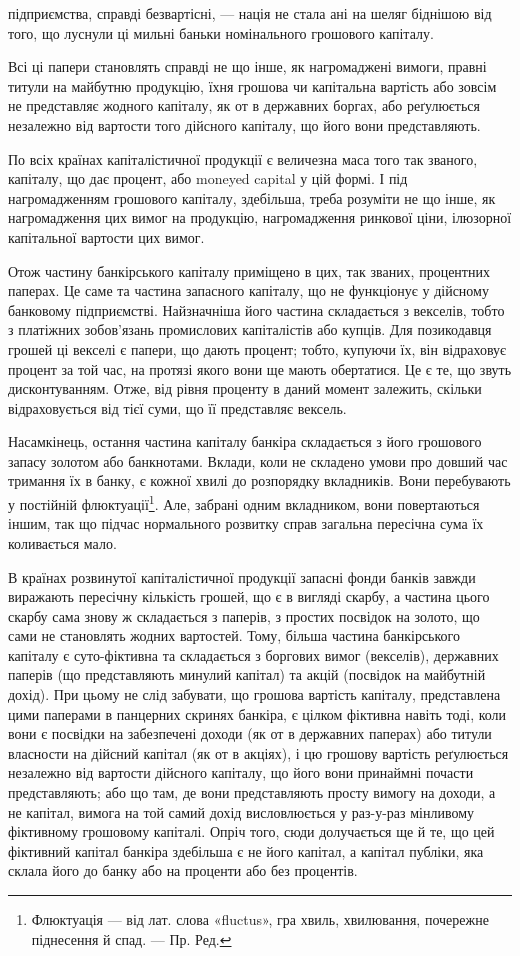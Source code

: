 підприємства, справді безвартісні, — нація не стала ані на шеляг біднішою
від того, що луснули ці мильні баньки номінального грошового капіталу.

Всі ці папери становлять справді не що інше, як нагромаджені вимоги,
правні титули на майбутню продукцію, їхня грошова чи капітальна вартість
або зовсім не представляє жодного капіталу, як от в державних боргах, або
реґулюється незалежно від вартости того дійсного капіталу, що його вони представляють.

По всіх країнах капіталістичної продукції є величезна маса того так званого,
капіталу, що дає процент, або moneyed capital у цій формі. І під нагромадженням
грошового капіталу, здебільша, треба розуміти не що інше, як нагромадження
цих вимог на продукцію, нагромадження ринкової ціни, ілюзорної
капітальної вартости цих вимог.

Отож частину банкірського капіталу приміщено в цих, так званих, процентних
паперах. Це саме та частина запасного капіталу, що не функціонує
у дійсному банковому підприємстві. Найзначніша його частина складається з
векселів, тобто з платіжних зобов’язань промислових капіталістів або купців.
Для позикодавця грошей ці векселі є папери, що дають процент; тобто, купуючи
їх, він відраховує процент за той час, на протязі якого вони ще мають обертатися.
Це є те, що звуть дисконтуванням. Отже, від рівня проценту в даний момент
залежить, скільки відраховується від тієї суми, що її представляє вексель.

Насамкінець, остання частина капіталу банкіра складається з його грошового
запасу золотом або банкнотами. Вклади, коли не складено умови про
довший час тримання їх в банку, є кожної хвилі до розпорядку вкладників.
Вони перебувають у постійній флюктуації\footnote*{
Флюктуація — від лат. слова «fluctus», гра хвиль, хвилювання, почережне піднесення й спад. — Пр.
Ред.
}. Але, забрані одним вкладником, вони
повертаються іншим, так що підчас нормального розвитку справ загальна пересічна
сума їх коливається мало.

В країнах розвинутої капіталістичної продукції запасні фонди банків
завжди виражають пересічну кількість грошей, що є в вигляді скарбу, а частина
цього скарбу сама знову ж складається з паперів, з простих посвідок на золото,
що сами не становлять жодних вартостей. Тому, більша частина банкірського
капіталу є суто-фіктивна та складається з боргових вимог (векселів), державних
паперів (що представляють минулий капітал) та акцій (посвідок на майбутній
дохід). При цьому не слід забувати, що грошова вартість капіталу,
представлена цими паперами в панцерних скринях банкіра, є цілком фіктивна
навіть тоді, коли вони є посвідки на забезпечені доходи (як от в державних
паперах) або титули власности на дійсний капітал (як от в акціях), і цю грошову
вартість реґулюється незалежно від вартости дійсного капіталу, що його
вони принаймні почасти представляють; або що там, де вони представляють просту
вимогу на доходи, а не капітал, вимога на той самий дохід висловлюється у
раз-у-раз мінливому фіктивному грошовому капіталі. Опріч того, сюди долучається
ще й те, що цей фіктивний капітал банкіра здебільша є не його капітал,
а капітал публіки, яка склала його до банку або на проценти або без процентів.

